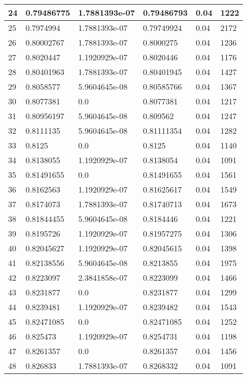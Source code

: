\begin{longtable}{|l|l|l|l|l|l|}
24 & 0.79486775 & 1.7881393e-07 & 0.79486793 & 0.04 & 1222 \\ \hline 
25 & 0.7974994 & 1.7881393e-07 & 0.79749924 & 0.04 & 2172 \\ \hline 
26 & 0.80002767 & 1.7881393e-07 & 0.8000275 & 0.04 & 1236 \\ \hline 
27 & 0.8020447 & 1.1920929e-07 & 0.8020446 & 0.04 & 1176 \\ \hline 
28 & 0.80401963 & 1.7881393e-07 & 0.80401945 & 0.04 & 1427 \\ \hline 
29 & 0.8058577 & 5.9604645e-08 & 0.80585766 & 0.04 & 1367 \\ \hline 
30 & 0.8077381 & 0.0 & 0.8077381 & 0.04 & 1217 \\ \hline 
31 & 0.80956197 & 5.9604645e-08 & 0.809562 & 0.04 & 1247 \\ \hline 
32 & 0.8111135 & 5.9604645e-08 & 0.81111354 & 0.04 & 1282 \\ \hline 
33 & 0.8125 & 0.0 & 0.8125 & 0.04 & 1140 \\ \hline 
34 & 0.8138055 & 1.1920929e-07 & 0.8138054 & 0.04 & 1091 \\ \hline 
35 & 0.81491655 & 0.0 & 0.81491655 & 0.04 & 1561 \\ \hline 
36 & 0.8162563 & 1.1920929e-07 & 0.81625617 & 0.04 & 1549 \\ \hline 
37 & 0.8174073 & 1.7881393e-07 & 0.81740713 & 0.04 & 1673 \\ \hline 
38 & 0.81844455 & 5.9604645e-08 & 0.8184446 & 0.04 & 1221 \\ \hline 
39 & 0.8195726 & 1.1920929e-07 & 0.81957275 & 0.04 & 1306 \\ \hline 
40 & 0.82045627 & 1.1920929e-07 & 0.82045615 & 0.04 & 1398 \\ \hline 
41 & 0.82138556 & 5.9604645e-08 & 0.8213855 & 0.04 & 1975 \\ \hline 
42 & 0.8223097 & 2.3841858e-07 & 0.8223099 & 0.04 & 1466 \\ \hline 
43 & 0.8231877 & 0.0 & 0.8231877 & 0.04 & 1299 \\ \hline 
44 & 0.8239481 & 1.1920929e-07 & 0.8239482 & 0.04 & 1543 \\ \hline 
45 & 0.82471085 & 0.0 & 0.82471085 & 0.04 & 1252 \\ \hline 
46 & 0.825473 & 1.1920929e-07 & 0.8254731 & 0.04 & 1198 \\ \hline 
47 & 0.8261357 & 0.0 & 0.8261357 & 0.04 & 1456 \\ \hline 
48 & 0.826833 & 1.7881393e-07 & 0.8268332 & 0.04 & 1091 \\ \hline 

\end{longtable}

